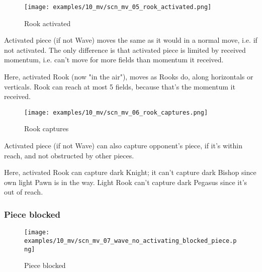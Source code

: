 \vspace*{-2.1\baselineskip}
\noindent
\begin{figure}[!h]
\texttt{[image: examples/10\_mv/scn\_mv\_05\_rook\_activated.png]}
\caption{Rook activated}
\label{fig:scn_mv_05_rook_activated}
\end{figure}

Activated piece (if not Wave) moves the same as it would in a normal move, i.e. if
not activated. The only difference is that activated piece is limited by received
momentum, i.e. can't move for more fields than momentum it received.

Here, activated Rook (now "in the air"), moves as Rooks do, along horizontals or
verticals. Rook can reach at most 5 fields, because that's the momentum it received.

\clearpage %

\vspace*{-2.1\baselineskip}
\noindent
\begin{figure}[!h]
\texttt{[image: examples/10\_mv/scn\_mv\_06\_rook\_captures.png]}
\caption{Rook captures}
\label{fig:scn_mv_06_rook_captures}
\end{figure}

Activated piece (if not Wave) can also capture opponent's piece, if it's within reach,
and not obstructed by other pieces.

Here, activated Rook can capture dark Knight; it can't capture dark Bishop since
own light Pawn is in the way. Light Rook can't capture dark Pegasus since it's out
of reach.

\clearpage %

\subsubsection*{Piece blocked}

\vspace*{-1.4\baselineskip}
\noindent
\begin{figure}[h]
\texttt{[image: examples/10\_mv/scn\_mv\_07\_wave\_no\_activating\_blocked\_piece.png]}
\caption{Piece blocked}
\label{fig:scn_mv_07_wave_no_activating_blocked_piece}
\end{figure}

